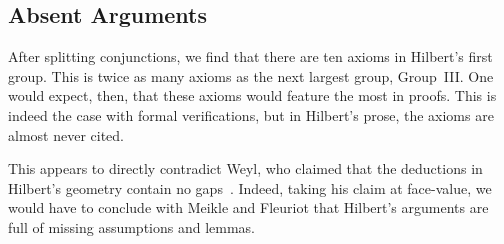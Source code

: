 
\subsection{Absent Arguments}
After splitting conjunctions, we find that there are ten axioms in Hilbert's first group. This is twice as many axioms as the next largest group, Group~III. One would expect, then, that these axioms would feature the most in proofs. This is indeed the case with formal verifications, but in Hilbert's prose, the axioms are almost never cited.

This appears to directly contradict Weyl, who claimed that the deductions in Hilbert's geometry contain no gaps~\cite{TableChairMug}. Indeed, taking his claim at face-value, we would have to conclude with Meikle and Fleuriot that Hilbert's arguments are full of missing assumptions and lemmas. 

